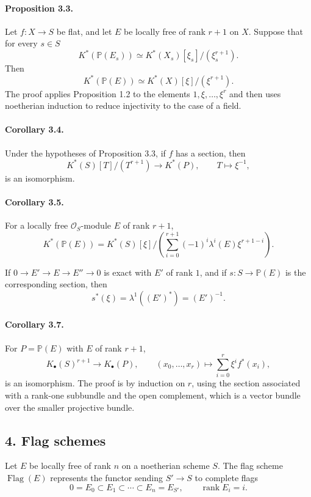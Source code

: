 \documentclass[12pt]{article}
\newcommand{\bP}{\mathbb P}
\newcommand{\cO}{\mathcal O}
\newcommand{\rank}{\operatorname{rank}}
\newcommand{\Drap}{\operatorname{Flag}}
\newcommand{\longto}{\longrightarrow}
\begin{document}
\paragraph{Proposition 3.3.}
Let $f:X\to S$ be flat, and let $E$ be locally free of rank $r+1$ on $X$. Suppose that for every $s\in S$
\[
K^*(\bP(E_s))\simeq K^*(X_s)[\xi_s]/(\xi_s^{r+1}).
\]
Then
\[
K^*(\bP(E))\simeq K^*(X)[\xi]/(\xi^{r+1}).
\]
The proof applies Proposition 1.2 to the elements $1,\xi,\ldots,\xi^r$ and then uses noetherian induction to reduce injectivity to the case of a field.

\paragraph{Corollary 3.4.}
Under the hypotheses of Proposition 3.3, if $f$ has a section, then
\[
K^*(S)[T]/(T^{r+1})\longto K^*(P),\qquad T\longmapsto\xi^{-1},
\]
is an isomorphism.

\paragraph{Corollary 3.5.}
For a locally free $\cO_S$-module $E$ of rank $r+1$,
\[
K^*(\bP(E))=
K^*(S)[\xi]\Big/\left(\sum_{i=0}^{r+1}(-1)^i\lambda^i(E)\xi^{r+1-i}\right).
\]

If $0\to E'\to E\to E''\to0$ is exact with $E'$ of rank $1$, and if $s:S\to\bP(E)$ is the corresponding section, then
\[
s^*(\xi)=\lambda^1((E')^*)=(E')^{-1}.
\]

\paragraph{Corollary 3.7.}
For $P=\bP(E)$ with $E$ of rank $r+1$,
\[
K_\bullet(S)^{r+1}\longto K_\bullet(P),\qquad
(x_0,\ldots,x_r)\longmapsto \sum_{i=0}^r \xi^i f^*(x_i),
\]
is an isomorphism. The proof is by induction on $r$, using the section associated with a rank-one subbundle and the open complement, which is a vector bundle over the smaller projective bundle.

\subsection*{4. Flag schemes}

Let $E$ be locally free of rank $n$ on a noetherian scheme $S$. The flag scheme $\Drap(E)$ represents the functor sending $S'\to S$ to complete flags
\[
0=E_0\subset E_1\subset\cdots\subset E_n=E_{S'},\qquad \rank E_i=i.
\]
\end{document}
